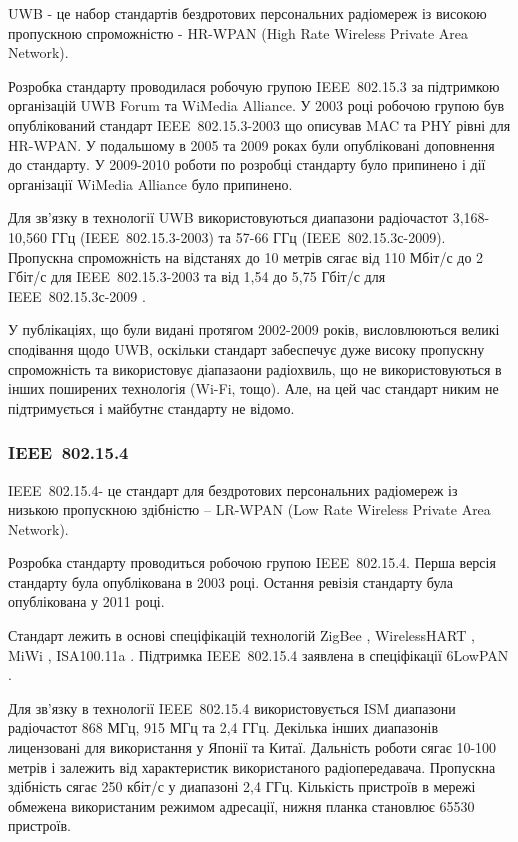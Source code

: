 \documentclass[a4paper,ukrainian,utf8,nocolumnsxix,floatsection,equationsection]{eskdtext}
\renewcommand\paragraph{\subsubsection}
\newcommand{\iee}[0]{IEEE~802.15.4\xspace}
\newcommand{\engtxt}[1]{\foreignlanguage{english}{#1}}
\begin{document}
UWB - це набор стандартів бездротових персональних радіомереж із високою пропускною спроможністю - HR-WPAN (High Rate Wireless Private Area Network).

Розробка стандарту проводилася робочую групою IEEE~802.15.3 за підтримкою організацій UWB Forum та WiMedia Alliance. У 2003 році робочою групою був опублікований стандарт IEEE~802.15.3-2003 що описував MAC та PHY рівні для HR-WPAN. У подальшому в 2005 та 2009 роках були опубліковані доповнення до стандарту. У 2009-2010 роботи по розробці стандарту було припинено і дії організації WiMedia Alliance було припинено.

Для зв’язку в технології UWB використовуються диапазони радіочастот 3,168-10,560 ГГц (IEEE~802.15.3-2003)  та 57-66 ГГц (IEEE~802.15.3с-2009). Пропускна спроможність на відстанях до 10 метрів сягає від 110 Мбіт/с до 2 Гбіт/с для IEEE~802.15.3-2003 та від 1,54 до 5,75 Гбіт/с для IEEE~802.15.3с-2009 \cite{ieee802153:moba:approach,802154c:first:1gb:data:rate}.

У публікаціях, що були видані протягом 2002-2009 років, висловлюються великі сподівання щодо UWB, оскільки стандарт забеспечує дуже високу пропускну спроможність та використовує діапазаони радіохвиль, що не використовуються в інших поширених технологія (Wi-Fi, тощо). Але, на цей час стандарт никим не підтримується і майбутнє стандарту не відомо.


\paragraph{\iee} %
\label{par:iee}

\iee - це стандарт для бездротових персональних радіомереж із низькою пропускною здібністю – LR-WPAN (\engtxt{Low Rate Wireless Private Area Network}). 

Розробка стандарту проводиться робочою групою \iee. Перша версія стандарту була опублікована в 2003 році. Остання ревізія стандарту була опублікована у 2011 році. 

Стандарт лежить в основі спеціфікацій технологій ZigBee \cite{zigbee:core:spec}, WirelessHART \cite{wihart:zigbee:comparison}, MiWi \cite{microchip:miwi}, ISA100.11a \cite{wireless:evolution}. Підтримка \iee заявлена в спеціфікації 6LowPAN \cite{rfc6282}.

Для зв’язку в технології \iee використовується ISM диапазони радіочастот 868 МГц, 915 МГц та 2,4 ГГц. Декілька інших диапазонів лицензовані для використання у Японії та Китаї. Дальність роботи сягає 10-100 метрів і залежить від характеристик використаного радіопередавача. Пропускна здібність сягає 250 кбіт/с у диапазоні 2,4 ГГц. Кількість пристроїв в мережі обмежена використаним режимом адресації, нижня планка становлює 65530 пристроїв.
\end{document}

